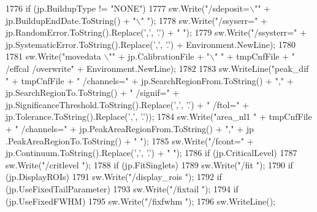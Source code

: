 \begin{DoxyCode}
1776             \textcolor{keywordflow}{if} (jp.BuildupType != \textcolor{stringliteral}{"NONE"})
1777                 sw.Write(\textcolor{stringliteral}{"/sdeposit=\(\backslash\)""} + jp.BuildupEndDate.ToString() + \textcolor{stringliteral}{"\(\backslash\)" "});
1778             sw.Write(\textcolor{stringliteral}{"/ssyserr="} + jp.RandomError.ToString().Replace(\textcolor{charliteral}{','}, \textcolor{charliteral}{'.'}) + \textcolor{stringliteral}{" "});
1779             sw.Write(\textcolor{stringliteral}{"/ssysterr="} + jp.SystematicError.ToString().Replace(\textcolor{charliteral}{','}, \textcolor{charliteral}{'.'}) + Environment.NewLine);
1780             
1781             sw.Write(\textcolor{stringliteral}{"movedata \(\backslash\)""} + jp.CalibrationFile + \textcolor{stringliteral}{"\(\backslash\)" "} + tmpCnfFile + \textcolor{stringliteral}{" /effcal /overwrite"} + 
      Environment.NewLine);
1782 
1783             sw.WriteLine(\textcolor{stringliteral}{"peak\_dif "} + tmpCnfFile + \textcolor{stringliteral}{" /channels="} + jp.SearchRegionFrom.ToString() + \textcolor{stringliteral}{","} + 
      jp.SearchRegionTo.ToString() + \textcolor{stringliteral}{" /signif="} + jp.SignificanceThreshold.ToString().Replace(\textcolor{charliteral}{','}, \textcolor{charliteral}{'.'}) + \textcolor{stringliteral}{"
       /ftol="} + jp.Tolerance.ToString().Replace(\textcolor{charliteral}{','}, \textcolor{charliteral}{'.'}));
1784             sw.Write(\textcolor{stringliteral}{"area\_nl1 "} + tmpCnfFile + \textcolor{stringliteral}{" /channels="} + jp.PeakAreaRegionFrom.ToString() + \textcolor{stringliteral}{","} + jp
      .PeakAreaRegionTo.ToString() + \textcolor{stringliteral}{" "});
1785             sw.Write(\textcolor{stringliteral}{"/fcont="} + jp.Continuum.ToString().Replace(\textcolor{charliteral}{','}, \textcolor{charliteral}{'.'}) + \textcolor{stringliteral}{" "});
1786             \textcolor{keywordflow}{if} (jp.CriticalLevel)
1787                 sw.Write(\textcolor{stringliteral}{"/critlevel "});
1788             \textcolor{keywordflow}{if} (jp.FitSinglets)
1789                 sw.Write(\textcolor{stringliteral}{"/fit "});
1790             \textcolor{keywordflow}{if} (jp.DisplayROIs)
1791                 sw.Write(\textcolor{stringliteral}{"/display\_rois "});
1792             \textcolor{keywordflow}{if} (jp.UseFixedTailParameter)
1793                 sw.Write(\textcolor{stringliteral}{"/fixtail "});
1794             \textcolor{keywordflow}{if} (jp.UseFixedFWHM)
1795                 sw.Write(\textcolor{stringliteral}{"/fixfwhm "});
1796             sw.WriteLine();

\end{DoxyCode}
